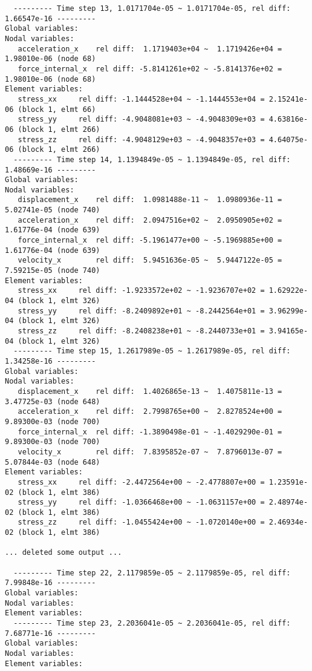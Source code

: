 \begin{verbatim}
  --------- Time step 13, 1.0171704e-05 ~ 1.0171704e-05, rel diff:  1.66547e-16 ---------
Global variables:
Nodal variables:
   acceleration_x    rel diff:  1.1719403e+04 ~  1.1719426e+04 = 1.98010e-06 (node 68)
   force_internal_x  rel diff: -5.8141261e+02 ~ -5.8141376e+02 = 1.98010e-06 (node 68)
Element variables:
   stress_xx     rel diff: -1.1444528e+04 ~ -1.1444553e+04 = 2.15241e-06 (block 1, elmt 66)
   stress_yy     rel diff: -4.9048081e+03 ~ -4.9048309e+03 = 4.63816e-06 (block 1, elmt 266)
   stress_zz     rel diff: -4.9048129e+03 ~ -4.9048357e+03 = 4.64075e-06 (block 1, elmt 266)
  --------- Time step 14, 1.1394849e-05 ~ 1.1394849e-05, rel diff:  1.48669e-16 ---------
Global variables:
Nodal variables:
   displacement_x    rel diff:  1.0981488e-11 ~  1.0980936e-11 = 5.02741e-05 (node 740)
   acceleration_x    rel diff:  2.0947516e+02 ~  2.0950905e+02 = 1.61776e-04 (node 639)
   force_internal_x  rel diff: -5.1961477e+00 ~ -5.1969885e+00 = 1.61776e-04 (node 639)
   velocity_x        rel diff:  5.9451636e-05 ~  5.9447122e-05 = 7.59215e-05 (node 740)
Element variables:
   stress_xx     rel diff: -1.9233572e+02 ~ -1.9236707e+02 = 1.62922e-04 (block 1, elmt 326)
   stress_yy     rel diff: -8.2409892e+01 ~ -8.2442564e+01 = 3.96299e-04 (block 1, elmt 326)
   stress_zz     rel diff: -8.2408238e+01 ~ -8.2440733e+01 = 3.94165e-04 (block 1, elmt 326)
  --------- Time step 15, 1.2617989e-05 ~ 1.2617989e-05, rel diff:  1.34258e-16 ---------
Global variables:
Nodal variables:
   displacement_x    rel diff:  1.4026865e-13 ~  1.4075811e-13 = 3.47725e-03 (node 648)
   acceleration_x    rel diff:  2.7998765e+00 ~  2.8278524e+00 = 9.89300e-03 (node 700)
   force_internal_x  rel diff: -1.3890498e-01 ~ -1.4029290e-01 = 9.89300e-03 (node 700)
   velocity_x        rel diff:  7.8395852e-07 ~  7.8796013e-07 = 5.07844e-03 (node 648)
Element variables:
   stress_xx     rel diff: -2.4472564e+00 ~ -2.4778807e+00 = 1.23591e-02 (block 1, elmt 386)
   stress_yy     rel diff: -1.0366468e+00 ~ -1.0631157e+00 = 2.48974e-02 (block 1, elmt 386)
   stress_zz     rel diff: -1.0455424e+00 ~ -1.0720140e+00 = 2.46934e-02 (block 1, elmt 386)

... deleted some output ...

  --------- Time step 22, 2.1179859e-05 ~ 2.1179859e-05, rel diff:  7.99848e-16 ---------
Global variables:
Nodal variables:
Element variables:
  --------- Time step 23, 2.2036041e-05 ~ 2.2036041e-05, rel diff:  7.68771e-16 ---------
Global variables:
Nodal variables:
Element variables:
\end{verbatim}

